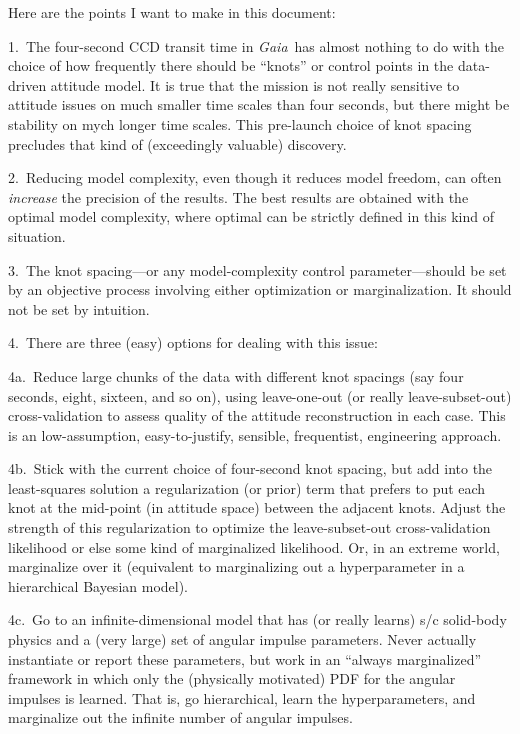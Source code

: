 \documentclass[12pt]{article}
\newcommand{\project}[1]{\textsl{#1}}
\newcommand{\gaia}{\project{Gaia}}
\begin{document}
\sloppy\sloppypar\raggedbottom

Here are the points I want to make in this document:

1.~The four-second CCD transit time in \gaia\ has almost nothing to do
with the choice of how frequently there should be ``knots'' or control
points in the data-driven attitude model.  It is true that the mission
is not really sensitive to attitude issues on much smaller time scales
than four seconds, but there might be stability on mych longer time
scales.  This pre-launch choice of knot spacing precludes that kind of
(exceedingly valuable) discovery.

2.~Reducing model complexity, even though it reduces model freedom,
can often \emph{increase} the precision of the results.  The best
results are obtained with the optimal model complexity, where optimal
can be strictly defined in this kind of situation.

3.~The knot spacing---or any model-complexity control
parameter---should be set by an objective process involving either
optimization or marginalization.  It should not be set by intuition.

4.~There are three (easy) options for dealing with this issue:

4a.~Reduce large chunks of the data with different knot spacings (say
four seconds, eight, sixteen, and so on), using leave-one-out (or
really leave-subset-out) cross-validation to assess quality of the
attitude reconstruction in each case.  This is an low-assumption,
easy-to-justify, sensible, frequentist, engineering approach.

4b.~Stick with the current choice of four-second knot spacing, but add
into the least-squares solution a regularization (or prior) term that
prefers to put each knot at the mid-point (in attitude space) between
the adjacent knots.  Adjust the strength of this regularization to
optimize the leave-subset-out cross-validation likelihood or else some
kind of marginalized likelihood.  Or, in an extreme world, marginalize
over it (equivalent to marginalizing out a hyperparameter in a
hierarchical Bayesian model).

4c.~Go to an infinite-dimensional model that has (or really learns)
s/c solid-body physics and a (very large) set of angular impulse
parameters.  Never actually instantiate or report these parameters,
but work in an ``always marginalized'' framework in which only the
(physically motivated) PDF for the angular impulses is learned.  That
is, go hierarchical, learn the hyperparameters, and marginalize out
the infinite number of angular impulses.
\end{document}
